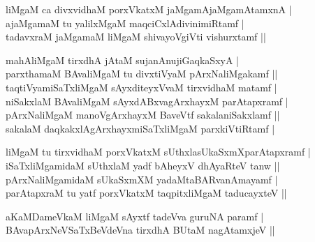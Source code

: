 \begin{entry}
\medskip
{}
\smallskip
{}
\medskip
\begin{shl}
liMgaM ca divxvidhaM porxVkatxM jaMgamAjaMgamAtamxnA |\\[2pt]
ajaMgamaM tu yalilxMgaM maqciCxlAdivinimiRtamf |\\[2pt]
tadavxraM jaMgamaM liMgaM shivayoVgiVti vishurxtamf ||\\[-1pt]
\end{shl}
\medskip
{}
\smallskip
{}
\medskip
\begin{shl}
mahAliMgaM tirxdhA jAtaM sujanAnujiGaqkaSxyA |\\[2pt]
parxthamaM BAvaliMgaM tu divxtiVyaM pArxNaliMgakamf ||\\[2pt]
taqtiVyamiSaTxliMgaM sAyxditeyxVvaM tirxvidhaM matamf |\\[2pt]
niSakxlaM BAvaliMgaM sAyxdABxvagArxhayxM parAtapxramf |\\[2pt]
pArxNaliMgaM manoVgArxhayxM BaveVtf sakalaniSakxlamf ||\\[2pt]
sakalaM daqkakxlAgArxhayxmiSaTxliMgaM parxkiVtiRtamf |\\[-1pt]
\end{shl}
\medskip
{}
\medskip
\begin{shl}
liMgaM tu tirxvidhaM porxVkatxM sUthxlasUkaSxmXparAtapxramf |\\[2pt]
iSaTxliMgamidaM sUthxlaM yadf bAheyxV dhAyaRteV tanw ||\\[2pt]
pArxNaliMgamidaM sUkaSxmXM yadaMtaBARvanAmayamf |\\[2pt]
parAtapxraM tu yatf porxVkatxM taqpitxliMgaM taducayxteV ||\\[-1pt]
\end{shl}
\medskip
{}
\medskip
\begin{shl}
aKaMDameVkaM liMgaM sAyxtf tadeVva guruNA paramf |\\[2pt]
BAvapArxNeVSaTxBeVdeVna tirxdhA BUtaM nagAtamxjeV ||\\[-1pt]

\end{shl}
\end{entry}
